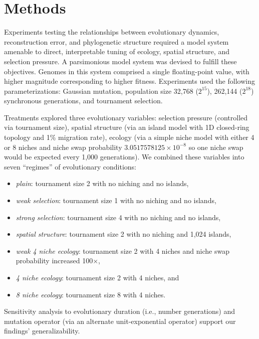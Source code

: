 \vspace{-1.5ex}
\section{Methods}

Experiments testing the relationships between evolutionary dynamics, reconstruction error, and phylogenetic structure required a model system amenable to direct, interpretable tuning of ecology, spatial structure, and selection pressure.
A parsimonious model system was devised to fulfill these objectives.
Genomes in this system comprised a single floating-point value, with higher magnitude corresponding to higher fitness.
Experiments used the following parameterizations: Gaussian mutation, population size 32,768 ($2^{15}$), 262,144 ($2^{18}$) synchronous generations, and tournament selection.

Treatments explored three evolutionary variables: selection pressure (controlled via tournament size), spatial structure (via an island model with 1D closed-ring topology and 1\% migration rate), ecology (via a simple niche model with either 4 or 8 niches and niche swap probability $3.0517578125 \times 10^{-8}$ so one niche swap would be expected every 1,000 generations).
We combined these variables into seven ``regimes'' of evolutionary conditions:

\begin{minipage}[t]{\columnwidth}
\begin{itemize}
  \item \textit{plain}: tournament size 2 with no niching and no islands,
  \item \textit{weak selection}: tournament size 1 with no niching and no islands,
  \item \textit{strong selection}: tournament size 4 with no niching and no islands,
  \item \textit{spatial structure}: tournament size 2 with no niching and 1,024 islands,
  \item \textit{weak 4 niche ecology}: tournament size 2 with 4 niches and niche swap probability increased 100$\times$,
  \item \textit{4 niche ecology}: tournament size 2 with 4 niches, and
  \item \textit{8 niche ecology}: tournament size 8 with 4 niches.
\end{itemize}
\end{minipage}

Sensitivity analysis to evolutionary duration (i.e., number generations) and mutation operator (via an alternate unit-exponential operator) support our findings' generalizability.

